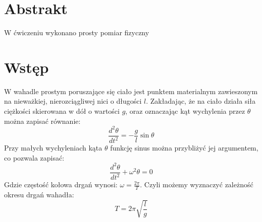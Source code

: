 \documentclass{article}
\begin{document}

\section{Abstrakt} 
	W ćwiczeniu wykonano prosty pomiar fizyczny 
	

\section{Wstęp}
	W wahadle prostym poruszające się ciało jest punktem materialnym zawieszonym na nieważkiej, nierozciągliwej nici o długości $l$. Zakładając, że na ciało działa siła ciężkości skierowana w dół o wartości $g$, oraz oznaczając kąt wychylenia przez $\theta$ można zapisać równanie:
	\begin{equation}
		\frac{d^2\theta}{dt^2} = -\frac{g}{l}\sin{\theta}
		\label{wzor1}
	\end{equation}
	Przy małych wychyleniach kąta $\theta$ funkcję sinus można przybliżyć jej argumentem, co pozwala zapisać:
	\begin{equation}
		\frac{d^2\theta}{dt^2} +\omega^2\theta = 0
		\label{wzor2}
	\end{equation}
	Gdzie częstość kołowa drgań wynosi: $\omega = \frac{2\pi}{T}$. Czyli możemy wyznaczyć zależność okresu drgań wahadła:
	\begin{equation}
		T = 2\pi\sqrt{\frac{l}{g}}
		\label{wzor3}
	\end{equation}
	
\end{document}
